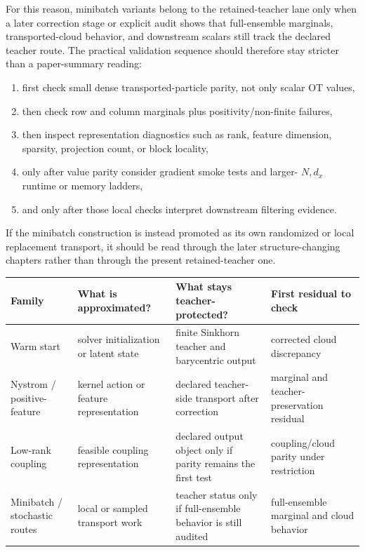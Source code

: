 For this reason, minibatch variants belong to the retained-teacher lane only when
a later correction stage or explicit audit shows that full-ensemble marginals,
transported-cloud behavior, and downstream scalars still track the declared
teacher route.  The practical validation sequence should therefore stay stricter
than a paper-summary reading:
\begin{enumerate}[label=(\arabic*)]
  \item first check small dense transported-particle parity, not only scalar OT
    values,
  \item then check row and column marginals plus positivity/non-finite failures,
  \item then inspect representation diagnostics such as rank, feature dimension,
    sparsity, projection count, or block locality,
  \item only after value parity consider gradient smoke tests and larger-
    \(N,d_x\) runtime or memory ladders,
  \item and only after those local checks interpret downstream filtering evidence.
\end{enumerate}
If the minibatch construction is instead promoted as its own randomized or local
replacement transport, it should be read through the later structure-changing
chapters rather than through the present retained-teacher one.

\begin{center}
\small
\begin{tabular}{p{} p{} p{} p{}}
\toprule
Family & What is approximated? & What stays teacher-protected? & First residual to check \\
\midrule
Warm start & solver initialization or latent state & finite Sinkhorn teacher and barycentric output & corrected cloud discrepancy \\
Nystrom / positive-feature & kernel action or feature representation & declared teacher-side transport after correction & marginal and teacher-preservation residual \\
Low-rank coupling & feasible coupling representation & declared output object only if parity remains the first test & coupling/cloud parity under restriction \\
Minibatch / stochastic routes & local or sampled transport work & teacher status only if full-ensemble behavior is still audited & full-ensemble marginal and cloud behavior \\
\bottomrule
\end{tabular}
\end{center}

